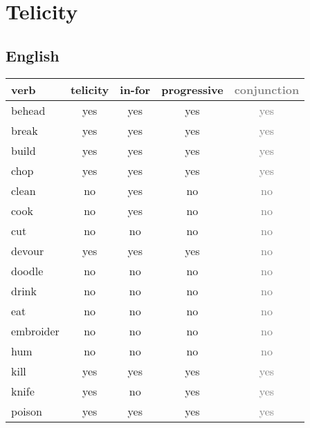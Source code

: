 \section{Telicity} 

\subsection{English}

\begin{longtable}{lc|ccc}
\textbf{verb} & \textbf{telicity} & \textbf{in-for} & \textbf{progressive} & \textbf{\textcolor{gray}{conjunction}}\\
\hline
\endhead
behead    & yes      & yes    & yes         & 	\textcolor{gray}{yes}         \\
break     & yes      & yes    & yes         & 	\textcolor{gray}{yes}         \\
build     & yes      & yes    & yes         & 	\textcolor{gray}{yes}         \\
chop      & yes      & yes    & yes         & 	\textcolor{gray}{yes}         \\
clean     & no       & yes    & no          & 	\textcolor{gray}{no}          \\
cook      & no       & yes    & no          & 	\textcolor{gray}{no}          \\
cut       & no       & no     & no          & 	\textcolor{gray}{no}          \\
devour    & yes      & yes    & yes         & 	\textcolor{gray}{no}          \\
doodle    & no       & no     & no          & 	\textcolor{gray}{no}          \\
drink     & no       & no     & no          & 	\textcolor{gray}{no}          \\
eat       & no       & no     & no          & 	\textcolor{gray}{no}          \\
embroider & no       & no     & no          & 	\textcolor{gray}{no}          \\
hum       & no       & no     & no          & 	\textcolor{gray}{no}          \\
kill      & yes      & yes    & yes         & 	\textcolor{gray}{yes}         \\
knife     & yes      & no     & yes         & 	\textcolor{gray}{yes}         \\
poison    & yes      & yes    & yes         & 	\textcolor{gray}{yes}         \\

\end{longtable}
